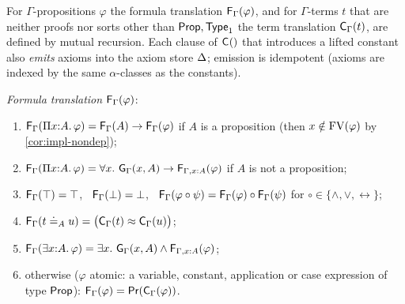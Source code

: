 \begin{definition}[Translation]
\label{def:translation}
For $\Gamma$-propositions $\varphi$ the formula translation
$\mathsf{F}_{\Gamma}(\varphi)$, and for $\Gamma$-terms $t$ that are neither
proofs nor sorts other than $\mathsf{Prop}, \mathsf{Type}_1$ the term translation
$\mathsf{C}_{\Gamma}(t)$, are defined by mutual recursion.  Each clause of
$\mathsf{C}_{}()$ that introduces a lifted constant also \emph{emits}
axioms into the axiom store $\Delta$; emission is idempotent (axioms
are indexed by the same $\alpha$-classes as the constants).

\medskip
\noindent\emph{Formula translation} $\mathsf{F}_{\Gamma}(\varphi)$:
\begin{enumerate}[label=(F\arabic*),leftmargin=3em]
\item $\mathsf{F}_{\Gamma}(\Pi x{:}A.\,\varphi) = \mathsf{F}_{\Gamma}(A) \to
  \mathsf{F}_{\Gamma}(\varphi)$ \quad if $A$ is a proposition
  (then $x \notin \mathrm{FV}(\varphi)$ by \cref{cor:impl-nondep});
\item $\mathsf{F}_{\Gamma}(\Pi x{:}A.\,\varphi) = \forall x.\
  \mathsf{G}_{\Gamma}(x,A) \to \mathsf{F}_{\Gamma, x:A}(\varphi)$ \quad if $A$ is
  not a proposition;
\item $\mathsf{F}_{\Gamma}(\top) = \top$, \ $\mathsf{F}_{\Gamma}(\bot) = \bot$, \
  $\mathsf{F}_{\Gamma}(\varphi \circ \psi) = \mathsf{F}_{\Gamma}(\varphi) \circ
  \mathsf{F}_{\Gamma}(\psi)$ for $\circ \in \{\wedge, \vee,
  \leftrightarrow\}$;
\item $\mathsf{F}_{\Gamma}(t \doteq_A u) = \bigl(\mathsf{C}_{\Gamma}(t) \approx
  \mathsf{C}_{\Gamma}(u)\bigr)$;
\item $\mathsf{F}_{\Gamma}(\exists x{:}A.\,\varphi) = \exists x.\
  \mathsf{G}_{\Gamma}(x,A) \wedge \mathsf{F}_{\Gamma, x:A}(\varphi)$;
\item otherwise ($\varphi$ atomic: a variable, constant, application
  or case expression of type $\mathsf{Prop}$): $\mathsf{F}_{\Gamma}(\varphi) =
  \mathsf{Pr}(\mathsf{C}_{\Gamma}(\varphi))$.
\end{enumerate}


\end{definition}
